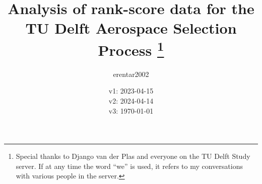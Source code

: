 \title{
    Analysis of rank-score data for the TU Delft Aerospace Selection Process
    \thanks{
        Special thanks to Django van der Plas and everyone on the TU Delft Study server. If at any time the word ``we'' is used, it refers to my conversations with various people in the server.
    }
}
\author{erentar2002}
\date{v1: 2023-04-15\\ v2: 2024-04-14\\ v3: \today}